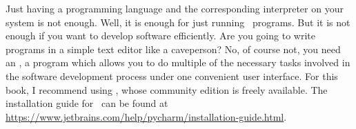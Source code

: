 %
\label{sec:installingPyCharm}%
%
Just having a programming language and the corresponding interpreter on your system is not enough.
Well, it is enough for just running \python\ programs.
But it is not enough if you want to develop software efficiently.
Are you going to write programs in a simple text editor like a caveperson?
No, of course not, you need an , a program which allows you to do multiple of the necessary tasks involved in the software development process under one convenient user interface.
For this book, I recommend using \pycharm, whose community edition is freely available.
The installation guide for \pycharm\ can be found at \url{https://www.jetbrains.com/help/pycharm/installation-guide.html}.%
%
%
%
\endhsection%
%
